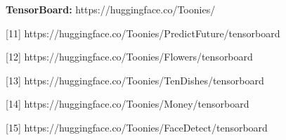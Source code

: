 \documentclass[12pt, a4paper]{article}
\begin{document}
\par \textbf{TensorBoard: }https://huggingface.co/Toonies/
\par \hspace{1cm} [11] https://huggingface.co/Toonies/PredictFuture/tensorboard
\par \hspace{1cm} [12] https://huggingface.co/Toonies/Flowers/tensorboard
\par \hspace{1cm} [13] https://huggingface.co/Toonies/TenDishes/tensorboard
\par \hspace{1cm} [14] https://huggingface.co/Toonies/Money/tensorboard
\par \hspace{1cm} [15] https://huggingface.co/Toonies/FaceDetect/tensorboard
\end{document}
